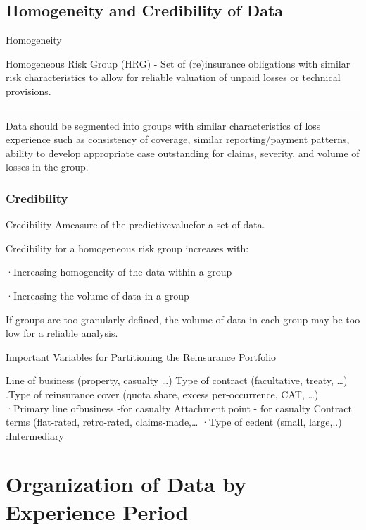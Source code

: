 \documentclass[
]{article}
\begin{document}
\subsection{Homogeneity and Credibility of
Data}\label{homogeneity-and-credibility-of-data}

Homogeneity

Homogeneous Risk Group (HRG) - Set of (re)insurance obligations with
similar risk characteristics to allow for reliable valuation of unpaid
losses or technical provisions.

\begin{center}\rule{0.5\linewidth}{0.5pt}\end{center}

Data should be segmented into groups with similar characteristics of
loss experience such as consistency of coverage, similar
reporting/payment patterns, ability to develop appropriate case
outstanding for claims, severity, and volume of losses in the group.

\subsubsection{Credibility}\label{credibility}

Credibility-Ameasure of the predictivevaluefor a set of data.

Credibility for a homogeneous risk group increases with:

·Increasing homogeneity of the data within a group

·Increasing the volume of data in a group

If groups are too granularly defined, the volume of data in each group
may be too low for a reliable analysis.

Important Variables for Partitioning the Reinsurance Portfolio

Line of business (property, casualty \ldots) Type of contract
(facultative, treaty, \ldots) .Type of reinsurance cover (quota share,
excess per-occurrence, CAT, \ldots) ·Primary line ofbusiness -for
casualty Attachment point - for casualty Contract terms (flat-rated,
retro-rated, claims-made,\ldots{} ·Type of cedent (small, large,..)
:Intermediary

\section{Organization of Data by Experience
Period}\label{organization-of-data-by-experience-period}
\end{document}
